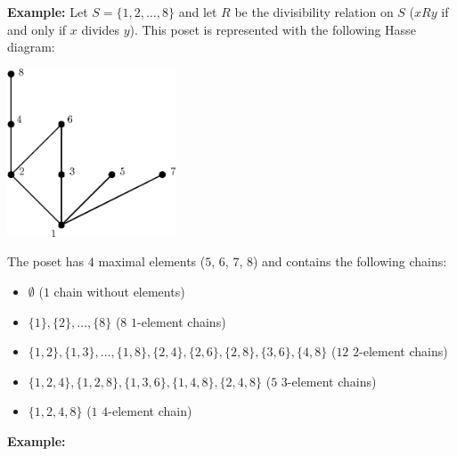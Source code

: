 \documentclass[11pt,paper=b5,footinclude,headinclude]{scrbook} %
\theoremstyle{remark}
\theoremstyle{definition} %
\theoremstyle{theorem} %
\begin{document}
\medskip
\textbf{ Example:}
Let $S = \{1,2,\ldots, 8\}$ and let $R$ be the divisibility relation on $S$ ($xRy$ if and only if $x$ divides $y$).
This poset is represented with the following Hasse diagram:

\medskip
\begin{center}
\includegraphics[height=50mm]{verige-deljivost.eps}
\end{center}

The poset has $4$ maximal elements ($5$, $6$, $7$, $8$) and contains the following chains:
\begin{itemize}
  \item $\emptyset$ ($1$ chain without elements)
  \item $\{1\}, \{2\}, \ldots, \{8\}$  ($8$ $1$-element chains)
  \item $\{1,2\}, \{1,3\},\ldots, \{1,8\},\{2,4\}, \{2,6\}, \{2,8\}, \{3,6\}, \{4,8\}$  ($12$ $2$-element chains)
  \item $\{1,2,4\}, \{1,2,8\},\{1,3,6\},\{1,4,8\}, \{2,4,8\}$  ($5$ $3$-element chains)
  \item $\{1,2,4,8\}$  ($1$ $4$-element chain)
\end{itemize}

%
%
%
\bigskip
\textbf{ Example:}
\end{document}
